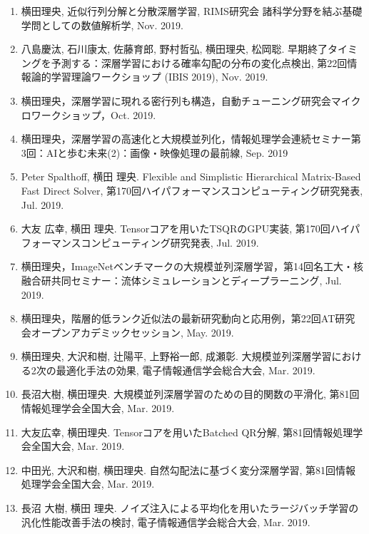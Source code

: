 \documentclass[margin,line]{cv}
\begin{document}
\begin{resume}
\begin{enumerate}
\item 横田理央, 近似行列分解と分散深層学習, RIMS研究会 諸科学分野を結ぶ基礎学問としての数値解析学, Nov. 2019.

\item 八島慶汰, 石川康太, 佐藤育郎, 野村哲弘, 横田理央, 松岡聡. 早期終了タイミングを予測する：深層学習における確率勾配の分布の変化点検出, 第22回情報論的学習理論ワークショップ (IBIS 2019), Nov. 2019.

\item 横田理央，深層学習に現れる密行列も構造，自動チューニング研究会マイクロワークショップ，Oct. 2019.

\item 横田理央，深層学習の高速化と大規模並列化，情報処理学会連続セミナー第3回：AIと歩む未来(2)：画像・映像処理の最前線, Sep. 2019

\item Peter Spalthoff, 横田 理央. Flexible and Simplistic Hierarchical Matrix-Based Fast Direct Solver, 第170回ハイパフォーマンスコンピューティング研究発表, Jul. 2019.

\item 大友 広幸, 横田 理央. Tensorコアを用いたTSQRのGPU実装, 第170回ハイパフォーマンスコンピューティング研究発表, Jul. 2019.

\item 横田理央，ImageNetベンチマークの大規模並列深層学習，第14回名工大・核融合研共同セミナー：流体シミュレーションとディープラーニング, Jul. 2019.

\item 横田理央，階層的低ランク近似法の最新研究動向と応用例，第22回AT研究会オープンアカデミックセッション, May. 2019.

\item 横田理央, 大沢和樹, 辻陽平, 上野裕一郎, 成瀬彰. 大規模並列深層学習における2次の最適化手法の効果, 電子情報通信学会総合大会, Mar. 2019.

\item 長沼大樹, 横田理央. 大規模並列深層学習のための目的関数の平滑化, 第81回情報処理学会全国大会, Mar. 2019.

\item 大友広幸, 横田理央. Tensorコアを用いたBatched QR分解, 第81回情報処理学会全国大会, Mar. 2019.

\item 中田光, 大沢和樹, 横田理央. 自然勾配法に基づく変分深層学習, 第81回情報処理学会全国大会, Mar. 2019.

\item 長沼 大樹, 横田 理央. ノイズ注入による平均化を用いたラージバッチ学習の汎化性能改善手法の検討, 電子情報通信学会総合大会, Mar. 2019.


\end{enumerate}
\end{resume}
\end{document}
